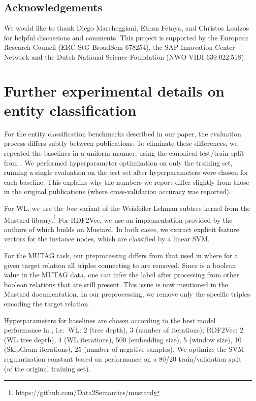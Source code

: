 \documentclass[letterpaper]{article} \usepackage{aaai18}  \usepackage{times}  \usepackage{helvet}  \usepackage{courier}  \usepackage{url}  \usepackage{graphicx}  \frenchspacing
\begin{document}
\subsection*{Acknowledgements}
We would like to thank Diego Marcheggiani, Ethan Fetaya, and Christos Louizos for helpful discussions and comments.
This project is supported by the European Research Council (ERC StG BroadSem 678254), the SAP Innovation
Center Network
and the Dutch National Science Foundation (NWO VIDI 639.022.518).




\newpage
\onecolumn
\setlength{\parskip}{0.5em}
\appendix
\section*{Further experimental details on entity classification}
\vspace{2em}

For the entity classification benchmarks described in our paper, the evaluation process differs subtly between publications. To eliminate these differences, we repeated the baselines in a uniform manner, using the canonical test/train split from \cite{ristoski2016collection}. We performed hyperparameter optimization on only the training set, running a single evaluation on the test set after hyperparameters were chosen for each baseline. This explains why the numbers we report differ slightly from those in the original publications (where cross-validation accuracy was reported).

For WL, we use the \textit{tree} variant of the Weisfeiler-Lehman subtree kernel from the Mustard library.\footnote{https://github.com/Data2Semantics/mustard}
For RDF2Vec, we use an implementation provided by the authors of \cite{ristoski2016rdf2vec} which builds on Mustard. In both cases, we extract explicit feature vectors for the instance nodes, which are classified by a linear SVM.

For the MUTAG task, our preprocessing differs from that used in \cite{de2015substructure,ristoski2016rdf2vec} where for a given target relation  all triples connecting  to  are removed. Since  is a boolean value in the MUTAG data, one can infer the label after processing from other boolean relations that are still present. This issue is now mentioned in the Mustard documentation. In our preprocessing, we remove only the specific triples encoding the target relation.

Hyperparameters for baselines are chosen according to the best model performance in \cite{ristoski2016rdf2vec}, i.e.~WL: 2 (tree depth), 3 (number of iterations); RDF2Vec: 2 (WL tree depth), 4 (WL iterations), 500 (embedding size), 5 (window size), 10 (SkipGram iterations), 25 (number of negative samples). We optimize the SVM regularization constant  based on performance on a 80/20 train/validation split (of the original training set).
\end{document}
